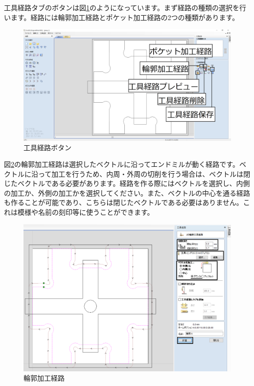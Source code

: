 \documentclass[b5paper, 9pt, twocolumn, titlepage,openany]{jsbook}%
\begin{document}
工具経路タブのボタンは図\ref{tool_button}のようになっています。まず経路の種類の選択を行います。経路には輪郭加工経路とポケット加工経路の2つの種類があります。\\
\begin{figure}[tbh]
  \begin{center}
    \begin{minipage}{1.0\columnwidth}
      \includegraphics[width=\columnwidth]{tool_button.png}
    \end{minipage}
    \caption{工具経路ボタン    \label{tool_button}}
  \end{center}
\end{figure}

\clearpage
図\ref{outer_milling}の輪郭加工経路は選択したベクトルに沿ってエンドミルが動く経路です。ベクトルに沿って加工を行うため、内周・外周の切削を行う場合は、ベクトルは閉じたベクトルである必要があります。経路を作る際にはベクトルを選択し、内側の加工か、外側の加工かを選択してください。また、ベクトルの中心を通る経路も作ることが可能であり、こちらは閉じたベクトルである必要はありません。これは模様や名前の刻印等に使うことができます。\\

\begin{figure}[tbh]
  \begin{center}
    \begin{minipage}{1.0\columnwidth}
      \includegraphics[width=\columnwidth]{outer_milling_trim.png}
    \end{minipage}
    \caption{輪郭加工経路    \label{outer_milling}}
  \end{center}
\end{figure}
\end{document}
